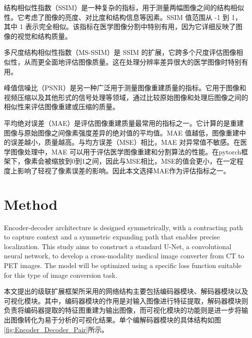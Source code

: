 \documentclass[twocolumn]{article}
\begin{document}
结构相似性指数（SSIM）是一种复杂的指标，用于测量两幅图像之间的结构相似性。它考虑了图像的亮度、对比度和结构信息等因素。SSIM 值范围从 -1 到 1，其中 1 表示完全相似。该指标在医学图像分割中特别有用，因为它详细反映了图像的视觉和结构质量。

多尺度结构相似性指数（MS-SSIM）是 SSIM 的扩展，它跨多个尺度评估图像相似性，从而更全面地评估图像质量。这在处理分辨率差异很大的医学图像时特别有用。

峰值信噪比（PSNR）是另一种广泛用于测量图像重建质量的指标。它用于图像和视频压缩以及其他形式的信号处理等领域，通过比较原始图像和处理后图像之间的相似性来评估图像重建或压缩的质量。

平均绝对误差（MAE）是评估图像重建质量最常用的指标之一。它计算的是重建图像与原始图像之间像素强度差异的绝对值的平均值。MAE 值越低，图像重建中的误差越小，质量越高。与均方误差（MSE）相比，MAE 对异常值不敏感。在医学图像处理中，MAE 可以用于评估医学图像重建和分割算法的性能。在pytorch框架下，像素会被缩放到0到1之间，因此与MSE相比，MSE的值会更小，在一定程度上影响了轻视了像素误差的影响。因此本文选择MAE作为评估指标之一。


\section{Method}
Encoder-decoder architecture is designed symmetrically, with a contracting path to capture context and a symmetric expanding path that enables precise localization. This study aims to construct a standard U-Net, a convolutional neural network, to develop a cross-modality medical image converter from CT to PET images. The model will be optimized using a specific loss function suitable for this type of image conversion task.

本文提出的级联扩展框架所采用的网络结构主要包括编码器模块、解码器模块以及可视化模块。其中，编码器模块的作用是对输入图像进行特征提取，解码器模块则负责将编码器提取的特征图重建为输出图像，而可视化模块的功能则是进一步将输出图像转化为易于分析的可视化结果。单个编解码器模块的具体结构如图\ref{fig:Encoder_Decoder_Pair}所示。
\end{document}
